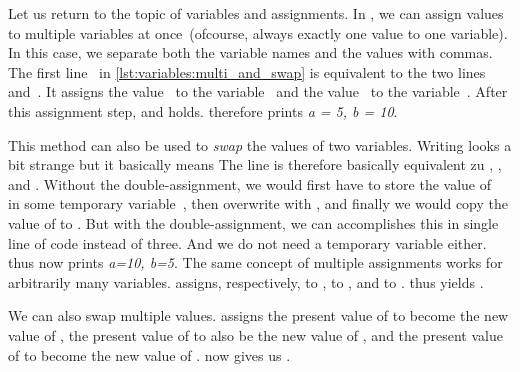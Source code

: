 %
%
%
%
%
Let us return to the topic of variables and assignments.
In \python, we can assign values to multiple variables at once~(ofcourse, always exactly one value to one variable).
In this case, we separate both the variable names and the values with commas.
The first line~\pythonIdx{,} in \cref{lst:variables:multi_and_swap} is equivalent to the two lines~ and~.
It assigns the value~ to the variable~ and the value~ to the variable~.
After this assignment step,  and  holds.
 therefore prints \textit{a = 5, b = 10}.

This method can also be used to \emph{swap} the values of two variables.
Writing  looks a bit strange but it basically means 
The line is therefore basically equivalent zu , , and .
Without the double-assignment, we would first have to store the value of~ in some temporary variable~, then overwrite  with , and finally we would copy the value of  to .
But with the double-assignment, we can accomplishes this in single line of code instead of three.
And we do not need a temporary variable either.
 thus now prints \textit{a=10, b=5}.%
%
%
%
The same concept of multiple assignments works for arbitrarily many variables.
 assigns, respectively,  to ,  to , and  to .
 thus yields .

We can also swap multiple values.
 assigns the present value of  to become the new value of , the present value of  to also be the new value of , and the present value of  to become the new value of .
 now gives us .
%
\FloatBarrier%
\endhsection%
%
